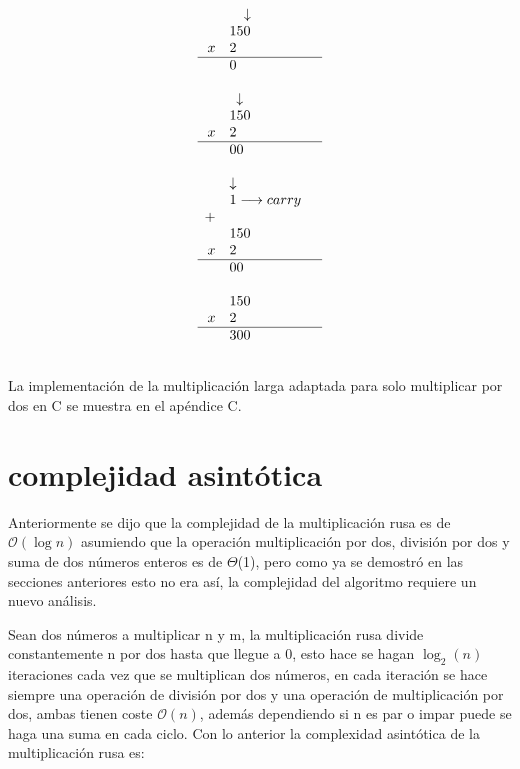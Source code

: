 \documentclass[10pt,journal,compsoc]{IEEEtran}
\begin{document}
\begin{center}
\[
\begin{array}{rl l}
& \hspace{0.36cm} \downarrow \\
& 150 \\
x & 2 &\\ \hline
& 0 &  \\
& &\\
& \hspace{0.17cm} \downarrow \\
& 150 &\\
x & 2 &\\ \hline
& 00 &  \\
& &\\
& \downarrow \\
& 1 \longrightarrow carry   \\
+ \\
& 150 & \\
x & 2 &\\ \hline
& 00 &  \\
& &\\
& 150 &\\
x & 2 & \\ \hline
& 300 &  \\
&    &\\
\end{array}
\]
\end{center}

La implementación de la multiplicación larga adaptada para solo multiplicar por dos en C se muestra en el apéndice C. 

\section{complejidad asintótica}

Anteriormente se dijo que la complejidad de la multiplicación rusa es de $\mathcal{O}(\log{}n)$ asumiendo que la operación multiplicación por dos, división por dos y suma de dos números enteros es de $\Theta$(1), pero como ya se demostró en las secciones anteriores esto no era así, la complejidad del algoritmo requiere un nuevo análisis.

Sean dos números a multiplicar n y m, la multiplicación rusa divide constantemente n por dos hasta que llegue a 0, esto hace se hagan $\log_2(n)$ iteraciones cada vez que se multiplican dos números, en cada iteración se hace siempre una operación de división por dos y una operación de multiplicación por dos, ambas tienen coste $\mathcal{O}(n)$, además dependiendo si n es par o impar puede se haga una suma en cada ciclo. Con lo anterior la complexidad asintótica de la multiplicación rusa es:
\end{document}
